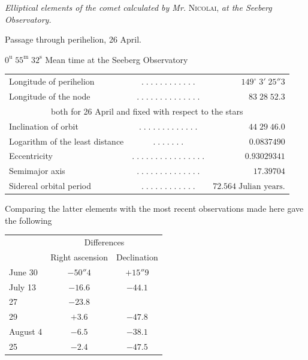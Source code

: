 \begin{center}
\emph{Elliptical elements of the comet calculated by Mr.} \textsc{Nicolai}, \emph{at the Seeberg Observatory.}
\end{center}

\begin{center}\fontsize{10}{12}\selectfont Passage through perihelion, 26 April.\par $0^{\mathrm u}\;55^{\mathrm m}\;32^{\mathrm s}$ Mean time at the Seeberg Observatory\end{center}
\begin{center}\fontsize{9}{11}\selectfont\setlength{\tabcolsep}{2pt}\renewcommand{\arraystretch}{1.15}\begin{tabular}{lcr}
Longitude of perihelion & $.\;.\;.\;.\;.\;.\;.\;.\;.\;.\;.\;.$ & $149^\circ\;3'\;25''3$\\
Longitude of the node & $.\;.\;.\;.\;.\;.\;.\;.\;.\;.\;.\;.\;.\;.$ & $83\;28\;52.3$\\
\multicolumn{3}{c}{both for 26 April and fixed with respect to the stars}\\
Inclination of orbit & $.\;.\;.\;.\;.\;.\;.\;.\;.\;.\;.\;.\;.$ & $44\;29\;46.0$\\
Logarithm of the least distance & $.\;.\;.\;.\;.\;.\;.$ & $0.0837490$\\
Eccentricity & $.\;.\;.\;.\;.\;.\;.\;.\;.\;.\;.\;.\;.\;.\;.\;.$ & $0.93029341$\\
Semimajor axis & $.\;.\;.\;.\;.\;.\;.\;.\;.\;.\;.\;.\;.\;.$ & $17.39704$\\
Sidereal orbital period & $.\;.\;.\;.\;.\;.\;.\;.\;.\;.\;.\;.$ & $72.564\;\text{Julian years.}$\\
\end{tabular}\end{center}

\begingroup\setlength{\rightskip}{0pt plus 1em}\par\indent Comparing the latter elements with the most recent observations made here gave the following\par\endgroup

\begin{center}
\fontsize{10}{12}\selectfont\setlength{\tabcolsep}{9pt}\renewcommand{\arraystretch}{1.15}\begin{tabular}{l | c | c}
& \multicolumn{2}{c}{Differences} \\
& Right ascension & Declination \\
\hline
June 30 & $-50''4$ & $+15''9$ \\
July 13 & $-16.6$ & $-44.1$ \\
27 & $-23.8$ & \\
29 & $+3.6$ & $-47.8$ \\
August 4 & $-6.5$ & $-38.1$ \\
25 & $-2.4$ & $-47.5$ \\
\end{tabular}
\end{center}

